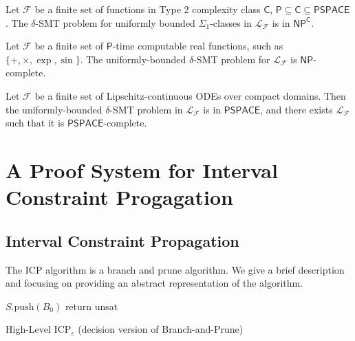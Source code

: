 \documentclass[envcountsect]{llncs}
\begin{document}
\begin{theorem}[Complexity]
Let $\mathcal{F}$ be a finite set of functions in Type 2 complexity class
$\mathsf{C}$, $\mathsf{P}\subseteq\mathsf{C}\subseteq\mathsf{PSPACE}$. The
$\delta$-SMT problem for uniformly bounded $\Sigma_1$-classes in
$\mathcal{L}_{\mathcal{F}}$ is in $\mathsf{NP^C}$. 
\end{theorem}
\begin{corollary}
Let $\mathcal{F}$ be a finite set of $\mathsf{P}$-time computable real
functions, such as $\{+, \times, \exp, \sin\}$. The uniformly-bounded
$\delta$-SMT problem for $\mathcal{L}_{\mathcal{F}}$ is $\mathsf{NP}$-complete.
\end{corollary}
\begin{corollary}
Let $\mathcal{F}$ be a finite set of Lipschitz-continuous ODEs over compact
domains. Then the uniformly-bounded $\delta$-SMT problem in
$\mathcal{L}_{\mathcal{F}}$ is in $\mathsf{PSPACE}$, and there exists
$\mathcal{L}_{\mathcal{F}}$ such that it is $\mathsf{PSPACE}$-complete.
\end{corollary}


\section{A Proof System for Interval Constraint Progagation}

\subsection{Interval Constraint Propagation}

The ICP algorithm is a branch and prune algorithm. We give a brief description
and focusing on providing an abstract representation of the algorithm.  

\begin{algorithm}\label{algo1}
\BlankLine
$S.\mathrm{push}(B_0)$\;
\While{$S\neq \emptyset$}{\label{while}
$B\leftarrow S.\mathrm{pop}()$ \;
\While{$\exists 1\leq i \leq m, B\neq \mathrm{Prune}(B,f_i)$}{
        $B\leftarrow\mathrm{Prune}(B, f_i)$ \;
}
\If{$B\neq \emptyset$}
{\eIf{$\exists 1\leq i\leq n, |I_i|\geq \varepsilon$}{$\{B_1,B_2\}\leftarrow
\mathrm{Branch}(B, i)$\;$S.\mathrm{push}(\{B_1,B_2\})$\;}{return {\sf sat}\;}}
}
return {\sf unsat}\;
\caption{High-Level ICP$_{\varepsilon}$ (decision version of Branch-and-Prune)}
\end{algorithm}
\end{document}

